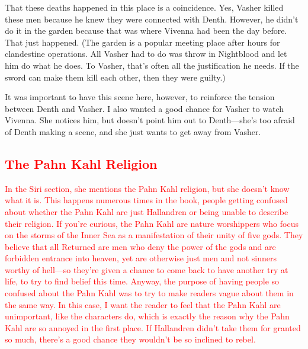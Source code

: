 That these deaths happened in this place is a coincidence. Yes, Vasher killed these men because he knew they were connected with Denth. However, he didn’t do it in the garden because that was where Vivenna had been the day before. That just happened. (The garden is a popular meeting place after hours for clandestine operations. All Vasher had to do was throw in Nightblood and let him do what he does. To Vasher, that’s often all the justification he needs. If the sword can make them kill each other, then they were guilty.)

It was important to have this scene here, however, to reinforce the tension between Denth and Vasher. I also wanted a good chance for Vasher to watch Vivenna. She notices him, but doesn’t point him out to Denth—she’s too afraid of Denth making a scene, and she just wants to get away from Vasher.

\textcolor{red}{
\subsection*{The Pahn Kahl Religion}
}
\textcolor{red}{
In the Siri section, she mentions the Pahn Kahl religion, but she doesn’t know what it is. This happens numerous times in the book, people getting confused about whether the Pahn Kahl are just Hallandren or being unable to describe their religion.
}
\textcolor{red}{
If you’re curious, the Pahn Kahl are nature worshippers who focus on the storms of the Inner Sea as a manifestation of their unity of five gods. They believe that all Returned are men who deny the power of the gods and are forbidden entrance into heaven, yet are otherwise just men and not sinners worthy of hell—so they’re given a chance to come back to have another try at life, to try to find belief this time.
}
\textcolor{red}{
Anyway, the purpose of having people so confused about the Pahn Kahl was to try to make readers vague about them in the same way. In this case, I want the reader to feel that the Pahn Kahl are unimportant, like the characters do, which is exactly the reason why the Pahn Kahl are so annoyed in the first place. If Hallandren didn’t take them for granted so much, there’s a good chance they wouldn’t be so inclined to rebel.
}



